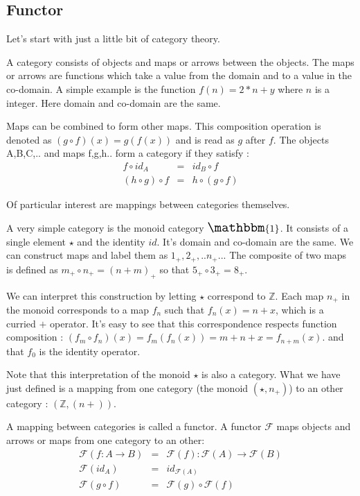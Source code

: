 \documentclass[12pt,fleqn]{article}
\begin{document}
%
%
\subsection{Functor}
\label{subsec:functor}

%
%
%
Let's start with just a little bit of category theory.

A category consists of objects and maps or arrows between the objects.
The maps or arrows are functions which take a value from the domain and to a value in the co-domain. A simple example is the function $f(n) = 2*n + y$ 
where $n$ is a integer. Here domain and co-domain are the same.

Maps can be combined to form other maps.
This composition operation is denoted as $(g \circ f)(x) = g(f(x))$ and is read as $g$ after $f$.
The  objects A,B,C,.. and maps f,g,h.. form a category if they satisfy :
\begin{eqnarray*}
f \circ id_{A} &=& id_{B} \circ f \\
(h \circ g) \circ f &=& h \circ (g \circ f)
\end{eqnarray*}

Of particular interest are mappings between categories themselves.

A very simple category is the monoid category $\Large \mathbbm{1}$.
It consists of a single element $\star$ and the identity $id$.
It's domain and co-domain are the same.
We can construct maps and label them as $1_+, 2_+,..n_+..$.
The composite of two maps is defined as $m_+ \circ n_+ = (n+m)_+$ so that $5_+ \circ 3_+ = 8_+$.

We can interpret this construction by letting $\star$ correspond to $\mathbb{Z}$.
Each map $n_+$ in the monoid corresponds to a map $f_n$ such that $f_{n}(x) = n + x$, which is a curried $+$ operator. 
It's easy to see that this correspondence respects function composition : $(f_m \circ f_n) (x) = f_m(f_n(x)) = m + n + x = f_{n+m}(x)$.
and that $f_0$ is the identity operator.

Note that this interpretation of the monoid $\star$ is also a category. 
What we have just defined is a mapping from one category (the monoid $(\star, n_+)$) to an other category : $(\mathbb{Z}, (n +))$.

A mapping between categories is called a functor. 
A functor $\mathcal{F}$ maps objects and arrows or maps from one category to an other:
\begin{eqnarray*}
\mathcal{F} (f : A \rightarrow B) &=& \mathcal{F}(f) : \mathcal{F}(A) \rightarrow \mathcal{F}(B) \\
\mathcal{F}(id_A) &=& id_{\mathcal{F}(A)} \\
\mathcal{F}(g \circ f) &=& \mathcal{F}(g) \circ \mathcal{F}(f)
\end{eqnarray*}
\end{document}
